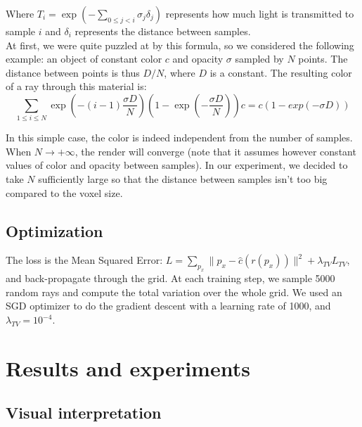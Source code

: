 \documentclass{article}
\begin{document}
Where $ T_i = \exp(- \sum_{0\leq j<i} \sigma_j \delta_j)$ represents how much light is transmitted to sample $i$ and $\delta_i$ represents the distance between samples.\\ 

At first, we were quite puzzled at by this formula, so we considered the following example: an object of constant color $c$ and opacity $\sigma$ sampled by $N$ points. The distance between points is thus $D/N$, where $D$ is a constant. The resulting color of a ray through this material is:
\[ \sum_{1 \leq i \leq N} \exp(- (i-1)\frac{ \sigma D}{N})(1 - \exp(-  \frac{ \sigma D}{N}))c = c (1 - exp(- \sigma D))\]

In this simple case, the color is indeed independent from the number of samples. When $N \rightarrow + \infty$, the render will converge (note that it assumes however constant values of color and opacity between samples). In our experiment, we decided to take $N$ sufficiently large so that the distance between samples isn't too big compared to the voxel size.


\subsection{Optimization}
The loss is the Mean Squared Error: $L = \sum_{p_x} \|p_x -\hat{c}(r(p_x)) \|^2 + \lambda_{TV}  L_{TV}$, and back-propagate through the grid. At each training step, we sample 5000 random rays and compute the total variation over the whole grid. We used an SGD optimizer to do the gradient descent with a learning rate of 1000, and $\lambda_{TV} = 10^{-4}$. 

\section{Results and experiments}\label{sec:results}

\subsection{Visual interpretation}
\end{document}
